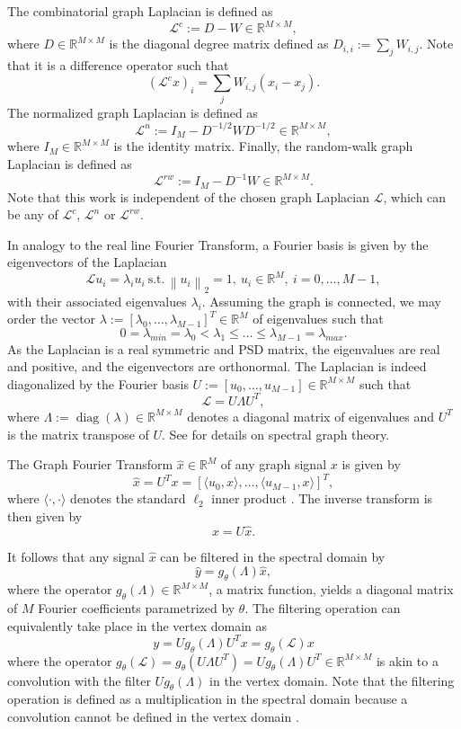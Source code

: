 \documentclass{article}
\DeclareMathOperator*{\diag}{diag}
\renewcommand{\L}{\mathcal{L}}
\newcommand{\R}{\mathbb{R}}
\newcommand{\st}{\ \text{s.t.} \,}
\newcommand{\norm}[1]{\left\| #1 \right\|}
\begin{document}
The combinatorial graph Laplacian is defined as
\[ \L^c := D - W \in \R^{M \times M}, \] where \(D \in \R^{M \times M}\)
is the diagonal degree matrix defined as \(D_{i,i} := \sum_j W_{i,j}\).
Note that it is a difference operator such that
\[ (\L^c x)_i = \sum_j W_{i,j} (x_i - x_j). \] The normalized graph
Laplacian is defined as
\[ \L^n := I_M - D^{-1/2} W D^{-1/2} \in \R^{M \times M}, \] where
\(I_M \in \R^{M \times M}\) is the identity matrix. Finally, the
random-walk graph Laplacian is defined as
\[ \L^{rw} := I_M - D^{-1} W \in \R^{M \times M}. \] Note that this work
is independent of the chosen graph Laplacian \(\L\), which can be any of
\(\L^c\), \(\L^n\) or \(\L^{rw}\).

In analogy to the real line Fourier Transform, a Fourier basis is given
by the eigenvectors of the Laplacian
\[ \L u_i = \lambda_i u_i \st \norm{u_i}_2=1,
\ u_i \in \R^M, \ i = 0, \ldots, M-1, \] with their associated
eigenvalues \(\lambda_i\). Assuming the graph is connected, we may order
the vector \(\lambda := [\lambda_0, \ldots, \lambda_{M-1}]^T \in \R^M\)
of eigenvalues such that
\[ 0 = \lambda_{min} = \lambda_0 < \lambda_1 \leq \ldots \leq
\lambda_{M-1} = \lambda_{max}. \] As the Laplacian is a real symmetric
and \gls{PSD} matrix, the eigenvalues are real and positive, and the
eigenvectors are orthonormal. The Laplacian is indeed diagonalized by
the Fourier basis \(U := [u_0, \ldots, u_{M-1}] \in \R^{M \times M}\)
such that
\begin{equation} \L = U \Lambda U^T, \label{eq:lap_diag}\end{equation}
where \(\Lambda := \diag(\lambda) \in \R^{M \times M}\) denotes a
diagonal matrix of eigenvalues and \(U^T\) is the matrix transpose of
\(U\). See \citep{chung_spectral_1997} for details on spectral graph
theory.

The Graph Fourier Transform \(\hat{x} \in \R^M\) of any graph signal
\(x\) is given by \[ \hat{x} = U^T x =
[\langle u_0, x \rangle, \ldots, \langle u_{M-1}, x \rangle]^T, \] where
\(\langle \cdot , \cdot \rangle\) denotes the standard \(\ell_2\) inner
product \citep{shuman_emerging_2013}. The inverse transform is then
given by \[
x = U \hat{x}. \]

It follows that any signal \(\hat{x}\) can be filtered in the spectral
domain by \[ \hat{y} = g_\theta(\Lambda) \hat{x}, \] where the operator
\(g_\theta(\Lambda) \in \R^{M \times M}\), a matrix function, yields a
diagonal matrix of \(M\) Fourier coefficients parametrized by
\(\theta\). The filtering operation can equivalently take place in the
vertex domain as \[ y = U g_\theta(\Lambda) U^T x = g_\theta(\L) x \]
where the operator
\(g_\theta(\L) = g_\theta(U \Lambda U^T) = U g_\theta(\Lambda) U^T \in \R^{M \times M}\)
is akin to a convolution with the filter \(Ug_\theta(\Lambda)\) in the
vertex domain. Note that the filtering operation is defined as a
multiplication in the spectral domain because a convolution cannot be
defined in the vertex domain \citep{shuman_emerging_2013}.
\end{document}
